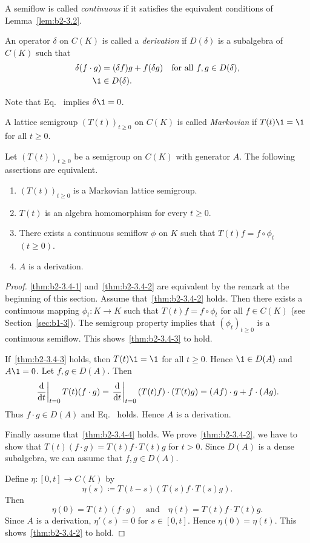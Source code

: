 A semiflow is called \emph{continuous} if it satisfies the equivalent conditions of Lemma~\ref{lem:b2-3.2}.
\begin{definition}\label{def:b2-3.3}
An operator $\delta$ on $C(K)$ is called a \emph{derivation} if\/ $D(\delta)$ is a subalgebra of\/ $C(K)$ such that
\begin{align}
\delta(f \cdot g) &= (\delta f)g + f(\delta g) \quad \text{for all } f,g \in D(\delta), \label{eq:b2-3.4} \\
\1 &\in D(\delta). \label{eq:b2-3.5}
\end{align}
\end{definition}
Note that Eq.~ implies $\delta\1 = 0$.

A lattice semigroup $(T(t))_{t \geq 0}$ on $C(K)$ is called \emph{Markovian} if\/ $T(t)\1 = \1$ for all $t \geq 0$.
\begin{theorem}\label{thm:b2-3.4}
Let $(T(t))_{t \geq 0}$ be a semigroup on $C(K)$ with generator $A$.
The following assertions are equivalent.
\begin{enumerate}[\upshape (a)]
\item \label{thm:b2-3.4-1}
$(T(t))_{t \geq 0}$ is a Markovian lattice semigroup.
\item \label{thm:b2-3.4-2}
$T(t)$ is an algebra homomorphism for every $t \geq 0$.
\item \label{thm:b2-3.4-3}
There exists a continuous semiflow $\phi$ on $K$ such that $T(t)f = f \circ \phi_{t}$ $(t \geq 0)$.
\item \label{thm:b2-3.4-4}
$A$ is a derivation.
\end{enumerate}
\end{theorem}
\begin{proof}
\ref{thm:b2-3.4-1} and~\ref{thm:b2-3.4-2} are equivalent by the remark at the beginning of this section.
Assume that~\ref{thm:b2-3.4-2} holds.
Then there exists a continuous mapping $\phi_{t} \colon K \to K$ such that $T(t)f = f \circ \phi_{t}$ for all $f \in C(K)$ (see Section~\ref{sec:b1-3}).
The semigroup property implies that $(\phi_{t})_{t \geq 0}$ is a continuous semiflow.
This shows~\ref{thm:b2-3.4-3}  to hold.

If~\ref{thm:b2-3.4-3} holds, then $T(t)\1 = \1$ for all $t \geq 0$. Hence $\1 \in D(A)$ and $A\1 = 0$.
Let $f,g \in D(A)$.
Then 
%
\[
	\left.\frac{\mathop{}\!\mathrm{d}{}}{\mathop{}\!\mathrm{d}{t}}\right|_{t=0} T(t)(f \cdot g) = \left.\frac{\mathop{}\!\mathrm{d}{}}{\mathop{}\!\mathrm{d}{t}}\right|_{t=0} (T(t)f) \cdot (T(t)g) = (Af) \cdot g + f \cdot (Ag).
\]
%
Thus $f \cdot g \in D(A)$ and Eq.~ holds.
Hence $A$ is a derivation.

Finally assume that~\ref{thm:b2-3.4-4} holds.
We prove~\ref{thm:b2-3.4-2}, \ie  we have to show that $T(t)(f \cdot g) = T(t)f \cdot T(t)g$ for $t > 0$.
Since $D(A)$ is a dense subalgebra, we can assume that $f,g \in D(A)$.

Define $\eta \colon [0,t] \to C(K)$ by 
%
\[
	\eta(s) \coloneq T(t-s) ( T(s)f \cdot T(s)g ).
\]
%
Then 
%
\[
	\eta(0) = T(t)(f \cdot g)
	\quad \text{and} \quad
	\eta(t) = T(t)f \cdot T(t)g.
\]
%
Since $A$ is a derivation, $\eta'(s) = 0$ for $s \in [0,t]$.
Hence $\eta(0) = \eta(t)$.
This shows~\ref{thm:b2-3.4-2} to hold.
\end{proof}
